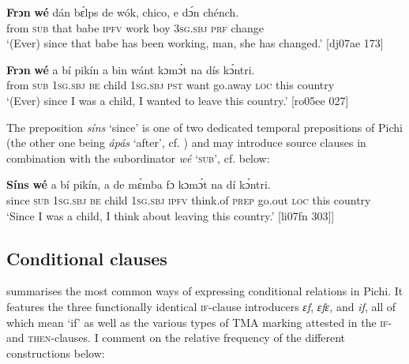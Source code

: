 \ea%
    \label{ex:key:1517}
    \gll \textbf{Frɔn}  \textbf{wé}  dán  bɛ́lps  de  wók,  chico,  e    dɔ́n  chénch.\\
from  \textsc{sub}  that  babe  \textsc{ipfv}  work  boy    \textsc{3sg.sbj}  \textsc{prf}  change\\

\glt ‘(Ever) since that babe has been working, man, she has changed.’ [dj07ae 173]
\z


\ea%
    \label{ex:key:1518}
    \gll \textbf{Frɔn}    \textbf{wé}  a  bí  pikín  a    bin  wánt  kɔmɔ́t
na  dís  kɔ́ntri.\\
from  \textsc{sub}  \textsc{1sg.sbj}  \textsc{be}  child  \textsc{1sg.sbj}  \textsc{pst}  want  go.away
\textsc{loc}  this  country\\

\glt ‘(Ever) since I was a child, I wanted to leave this country.’ [ro05ee 027]
\z

The preposition \textit{síns} ‘since’ is one of two dedicated temporal prepositions of Pichi (the other one being \textit{ápás} ‘after’, cf. ) and may introduce source clauses in combination with the subordinator \textit{wé} ‘\textsc{sub’,} cf.  below:


\ea%
    \label{ex:key:1519}
    \gll \textbf{Síns}    \textbf{wé}  a    bí  pikín,  a    de  mɛ́mba  fɔ
kɔmɔ́t  na  dí  kɔ́ntri.\\
since  \textsc{sub}  \textsc{1sg.sbj}  \textsc{be}  child  \textsc{1sg.sbj}  \textsc{ipfv}  think.of  \textsc{prep}
go.out  \textsc{loc}  this  country\\

\glt ‘Since I was a child, I think about leaving this country.’ [li07fn 303]]
\z

\subsection{Conditional clauses}\label{sec:10.7.11}
 summarises the most common ways of expressing conditional relations in Pichi. It features the three functionally identical \textsc{if-}clause introducers \textit{ɛf}, \textit{ɛfɛ,} and \textit{if}, all of which mean ‘if’ as well as the various types of TMA marking attested in the \textsc{if-} and \textsc{then-}clauses. I comment on the relative frequency of the different constructions below:

